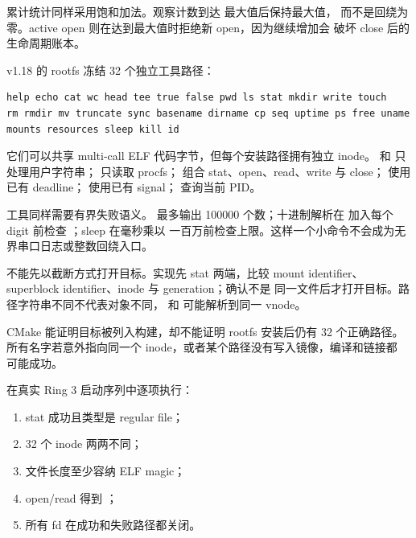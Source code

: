 累计统计同样采用饱和加法。观察计数到达  最大值后保持最大值，
而不是回绕为零。active open 则在达到最大值时拒绝新 open，因为继续增加会
破坏 close 后的生命周期账本。

v1.18 的 rootfs 冻结 32 个独立工具路径：

\begin{lstlisting}[caption={冻结的用户工具集合}]
help echo cat wc head tee true false pwd ls stat mkdir write touch
rm rmdir mv truncate sync basename dirname cp seq uptime ps free uname
mounts resources sleep kill id
\end{lstlisting}

它们可以共享 multi-call ELF 代码字节，但每个安装路径拥有独立 inode。
 和  只处理用户字符串；
 只读取 procfs；
 组合 stat、open、read、write 与 close； 使用已有
deadline； 使用已有 signal； 查询当前 PID。

工具同样需要有界失败语义。 最多输出 100000 个数；十进制解析在
加入每个 digit 前检查 ；sleep 在毫秒乘以
一百万前检查上限。这样一个小命令不会成为无界串口日志或整数回绕入口。

\begin{failurebox}
 不能先以截断方式打开目标。实现先 stat 两端，比较
mount identifier、superblock identifier、inode 与 generation；确认不是
同一文件后才打开目标。路径字符串不同不代表对象不同，
和  可能解析到同一 vnode。
\end{failurebox}

CMake 能证明目标被列入构建，却不能证明 rootfs 安装后仍有 32 个正确路径。
所有名字若意外指向同一个 inode，或者某个路径没有写入镜像，编译和链接都
可能成功。

 在真实 Ring 3 启动序列中逐项执行：

\begin{enumerate}[leftmargin=2.1em]
  \item stat 成功且类型是 regular file；
  \item 32 个 inode 两两不同；
  \item 文件长度至少容纳 ELF magic；
  \item open/read 得到 ；
  \item 所有 fd 在成功和失败路径都关闭。
\end{enumerate}


